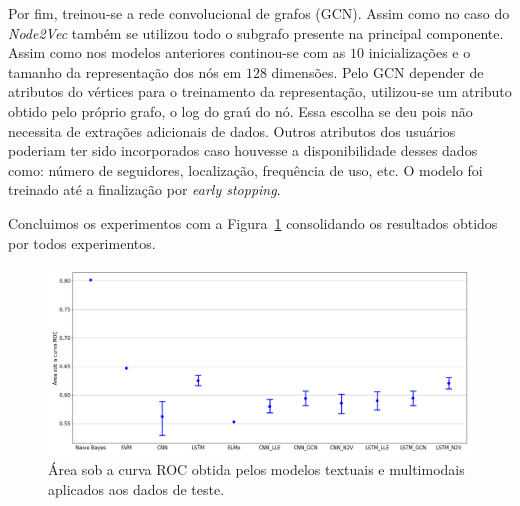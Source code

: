Por fim, treinou-se a rede convolucional de grafos (GCN).
Assim como no caso do \textit{Node2Vec} também se utilizou todo o subgrafo
presente na principal componente.
Assim como nos modelos anteriores continou-se com as $10$ inicializações e o
tamanho da representação dos nós em $128$ dimensões.
Pelo GCN depender de atributos do vértices para o treinamento da representação,
utilizou-se um atributo obtido pelo próprio grafo, o log do graú do nó.
Essa escolha se deu pois não necessita de extrações adicionais de dados.
Outros atributos dos usuários poderiam ter sido incorporados caso houvesse a
disponibilidade desses dados como: número de seguidores, localização,
frequência de uso, etc.
O modelo foi treinado até a finalização por \textit{early stopping}.

Concluimos os experimentos com a Figura~\ref{fig:experiment_results}
consolidando os resultados obtidos por todos experimentos.

\begin{figure}[h]
\begin{center} {
    \begin{center}
    \includegraphics[scale=0.35]{images/experiment_results.png}
    \caption{Área sob a curva ROC obtida pelos modelos textuais e multimodais
             aplicados aos dados de teste.}
    \label{fig:experiment_results}
    \end{center}
}
\end{center}
\end{figure}

